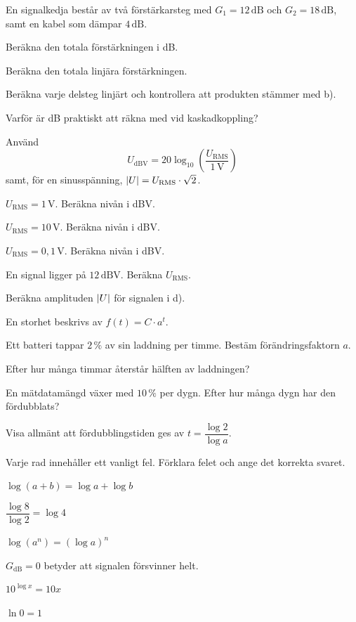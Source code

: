 En signalkedja består av två förstärkarsteg med $G_1 = 12\,\text{dB}$ och $G_2 = 18\,\text{dB}$,
samt en kabel som dämpar $4\,\text{dB}$.
\begin{parts}
  \item Beräkna den totala förstärkningen i dB.
  \item Beräkna den totala linjära förstärkningen.
  \item Beräkna varje delsteg linjärt och kontrollera att produkten stämmer med b).
  \item Varför är dB praktiskt att räkna med vid kaskadkoppling?
\end{parts}

Använd
\[
  U_{\text{dBV}} = 20\log_{10}\left(\frac{U_{\text{RMS}}}{1\,\text{V}}\right)
\]
samt, för en sinusspänning, $\lvert U\rvert = U_{\text{RMS}} \cdot \sqrt{2}$.
\begin{parts}
  \item $U_{\text{RMS}} = 1\,\text{V}$. Beräkna nivån i dBV.
  \item $U_{\text{RMS}} = 10\,\text{V}$. Beräkna nivån i dBV.
  \item $U_{\text{RMS}} = 0{,}1\,\text{V}$. Beräkna nivån i dBV.
  \item En signal ligger på $12\,\text{dBV}$. Beräkna $U_{\text{RMS}}$.
  \item Beräkna amplituden $\lvert U\rvert$ för signalen i d).
\end{parts}

En storhet beskrivs av $f(t) = C \cdot a^t$.
\begin{parts}
  \item Ett batteri tappar $2\,\%$ av sin laddning per timme. Bestäm förändringsfaktorn $a$.
  \item Efter hur många timmar återstår hälften av laddningen?
  \item En mätdatamängd växer med $10\,\%$ per dygn. Efter hur många dygn har den fördubblats?
  \item Visa allmänt att fördubblingstiden ges av $t = \dfrac{\log 2}{\log a}$.
\end{parts}

Varje rad innehåller ett vanligt fel. Förklara felet och ange det korrekta svaret.
\begin{parts}
  \item $\log(a + b) = \log a + \log b$
  \item $\dfrac{\log 8}{\log 2} = \log 4$
  \item $\log(a^n) = (\log a)^n$
  \item $G_{\text{dB}} = 0$ betyder att signalen försvinner helt.
  \item $10^{\log x} = 10x$
  \item $\ln 0 = 1$
\end{parts}

